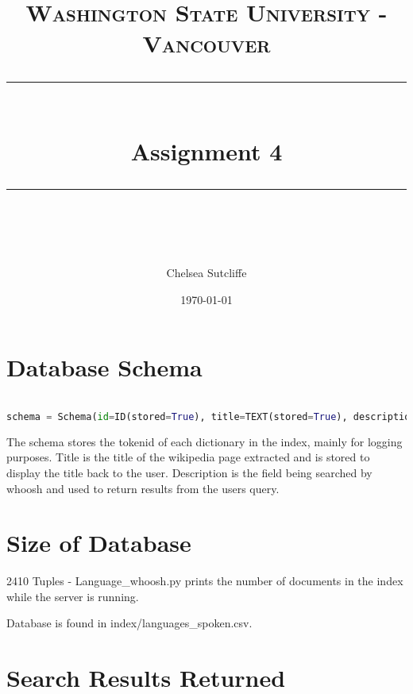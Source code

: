 \documentclass[11pt]{scrartcl} %
\title{	
	\normalfont\normalsize
	\textsc{Washington State University - Vancouver}\\ %
	\vspace{25pt} %
	\rule{\linewidth}{0.5pt}\\ %
	\vspace{20pt} %
	{\huge Assignment 4}\\ %
	\vspace{12pt} %
	\rule{\linewidth}{1pt}\\ %
	\vspace{12pt} %
}
\author{\LARGE Chelsea Sutcliffe} %
\date{\normalsize\today} %
\begin{document}
\maketitle %


\section{Database Schema}

\begin{lstlisting}[language=Python]

schema = Schema(id=ID(stored=True), title=TEXT(stored=True), description=TEXT(stored=True))

\end{lstlisting}

The schema stores the tokenid of each dictionary in the index, mainly for logging purposes. Title is the title of the wikipedia page extracted and is stored to display the title back to the user. Description is the field being searched by whoosh and used to return results from the users query.



\section{Size of Database}

2410 Tuples - Language\_whoosh.py prints the number of documents in the index while the server is running. \par

\noindent Database is found in index/languages\_spoken.csv.


\section{Search Results Returned}
\end{document}
